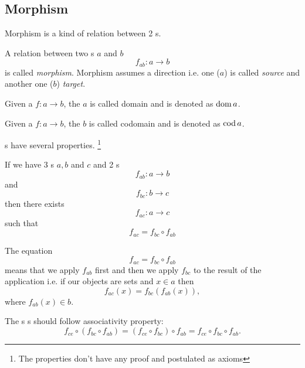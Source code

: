 \subsection{Morphism}
Morphism is a kind of relation between 2 s. 
\begin{definition}[Morphism]
  \label{def:morphism}
  A relation between two s $a$ and $b$ 
  \[
  f_{ab}: a \rightarrow b
  \]
  is called
  \textit{morphism}. Morphism assumes a direction i.e. one 
  ($a$) is called \textit{source} and another one ($b$) \textit{target}.
\end{definition}

\begin{definition}[Domain]
  \label{def:domain}
  Given a  $f: a \to b$, the
   $a$ is called domain and is denoted as $\operatorname{dom} a$.
\end{definition}

\begin{definition}[Codomain]
  \label{def:codomain}
  Given a  $f: a \to b$, the
   $b$ is called codomain and is denoted as $\operatorname{cod} a$.
\end{definition}

s have several properties. \footnote{The
  properties don't have any proof and postulated as axioms}
\begin{property}[Composition]
  \label{prop:composition}
  If we have 3 s $a, b$ and $c$ and 2
  s 
  \[
  f_{ab} : a \rightarrow b
  \]
  and 
  \[
  f_{bc} : b \rightarrow c
  \]
  then there exists  
  \[
  f_{ac} : a \rightarrow c
  \]
  such that
  \[
  f_{ac} = f_{bc} \circ f_{ab}
  \]
\end{property}

\begin{remark}[Composition]
  \label{rem:composition}
  The equation
  \[
  f_{ac} = f_{bc} \circ f_{ab}
  \]
  means that we apply $f_{ab}$ first and then we apply $f_{bc}$ to the
  result of the application i.e. if our objects are sets and $x \in a$
  then 
  \[
  f_{ac} ( x ) = f_{bc} ( f_{ab} ( x ) ),
  \]
  where $f_{ab} ( x ) \in b$.
\end{remark}

\begin{property}[Associativity]
  \label{prop:associativity}
  The s s should
  follow associativity property:
  \[
  f_{ce} \circ (f_{bc} \circ f_{ab}) = (f_{ce} \circ f_{bc}) \circ
  f_{ab} = f_{ce} \circ f_{bc} \circ f_{ab}.
  \]
\end{property}

